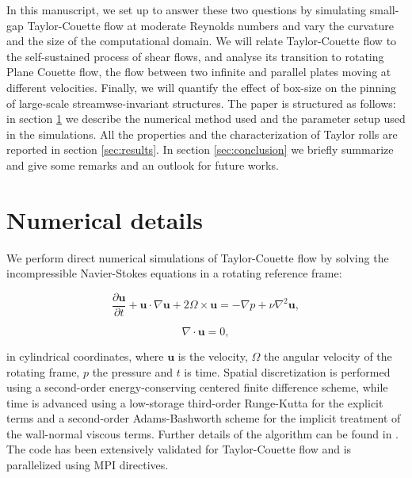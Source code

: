 \documentclass{jfm}
\begin{document}
In this manuscript, we set up to answer these two questions by simulating small-gap Taylor-Couette flow at moderate Reynolds numbers and vary the curvature and the size of the computational domain. We will relate Taylor-Couette flow to the self-sustained process of shear flows, and analyse its transition to rotating Plane Couette flow, the flow between two infinite and parallel plates moving at different velocities. Finally, we will quantify the effect of box-size on the pinning of large-scale streamwse-invariant structures. The paper is structured as follows: in section \ref{sec:numerics} we describe the numerical method used and the parameter setup used in the simulations. All the properties and the characterization of Taylor rolls are reported in section \ref{sec:results}. In section \ref{sec:conclusion} we briefly summarize and give some remarks and an outlook for future works.

\section{Numerical details}\label{sec:numerics}

We perform direct numerical simulations of Taylor-Couette flow by solving the incompressible Navier-Stokes equations in a rotating reference frame:

\begin{equation}
 \displaystyle\frac{\partial \textbf{u}}{\partial t} + \textbf{u}\cdot \nabla \textbf{u} + 2\Omega\times\textbf{u} = -\nabla p + \nu \nabla^2 \textbf{u},
 \end{equation}
 
 \begin{equation}
  \nabla \cdot \textbf{u} = 0,
 \end{equation}

\noindent in cylindrical coordinates, where $\textbf{u}$ is the velocity, $\Omega$ the angular velocity of the rotating frame, $p$ the pressure and $t$ is time. Spatial discretization is performed using a second-order energy-conserving centered finite difference scheme, while time is advanced using a low-storage third-order Runge-Kutta for the explicit terms and a second-order Adams-Bashworth scheme for the implicit treatment of the wall-normal viscous terms. Further details of the algorithm can be found in \citep{ver96,poe15}. The code has been extensively validated for Taylor-Couette flow \citep{ost14} and is parallelized using MPI directives. 
\end{document}
